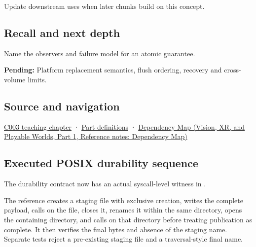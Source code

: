 \hypertarget{appendix-e89a8f290ef5-used-by}{}

Update downstream uses when later chunks build on this concept.

\subsection{Recall and next depth}\label{appendix-e89a8f290ef5-recall-and-next-depth}

\hypertarget{appendix-e89a8f290ef5-recall-and-next-depth}{}

Name the observers and failure model for an atomic guarantee.

\textbf{Pending:} Platform replacement semantics, flush ordering, recovery and cross-volume limits.

\subsection{Source and navigation}\label{appendix-e89a8f290ef5-source-and-navigation}

\hypertarget{appendix-e89a8f290ef5-source-and-navigation}{}

\hyperref[01-foundations-i-ch002-where-the-bytes-live]{C003 teaching chapter} · \hyperref[appendix-fd090d982a15-m003---parts-41-60]{Part definitions} · \href{../07-Vision-XR-and-Playable-Worlds-P01/main.pdf\#appendix-4ad47bdd269a}{Dependency Map (Vision, XR, and Playable Worlds, Part 1, Reference notes: Dependency Map)}

\subsection{Executed POSIX durability sequence}\label{appendix-e89a8f290ef5-executed-posix-durability-sequence}

\hypertarget{appendix-e89a8f290ef5-executed-posix-durability-sequence}{}

The durability contract now has an actual syscall-level witness in .

The reference creates a staging file with exclusive creation, writes the complete payload, calls  on the file, closes it, renames it within the same directory, opens the containing directory, and calls  on that directory before treating publication as complete. It then verifies the final bytes and absence of the staging name. Separate tests reject a pre-existing staging file and a traversal-style final name.

